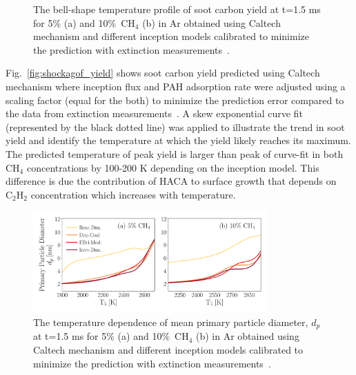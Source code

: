 \begin{figure}[H]
	\centering
	\caption{The bell-shape temperature profile of soot carbon yield at t=1.5 ms for 5\% (a) and 10\%~$\mathrm{CH_4}$ (b) in Ar obtained using Caltech mechanism and different inception models calibrated to minimize the prediction with extinction measurements~\citep{agafonov2016unified}.}
	\label{fig:shockagof_yield_cvr} 
\end{figure}

Fig.~\ref{fig:shockagof_yield} shows soot carbon yield predicted using Caltech mechanism where inception flux and PAH adsorption rate were adjusted using a scaling factor (equal for the both) to minimize the prediction error compared to the data from extinction measurements~\citep{agafonov2016unified}. A skew exponential curve fit (represented by the black dotted line) was applied to illustrate the trend in soot yield and identify the temperature at which the yield likely reaches its maximum. The predicted temperature of peak yield is larger than peak of curve-fit in both $\mathrm{CH_4}$ concentrations by 100-200 K depending on the inception model. This difference is due the contribution of  HACA to surface growth that depends on $\mathrm{C_2H_2}$ concentration which increases with temperature.

\begin{figure}[H]
	\centering
	\includegraphics[width=0.8\textwidth]{Figures/Results/Shocktube/Agafonov2016_cvr/d_p.pdf}
	\caption{The temperature dependence of mean primary particle diameter, $d_p$ at t=1.5 ms for 5\% (a) and 10\%~$\mathrm{CH_4}$ (b) in Ar obtained using Caltech mechanism and different inception models calibrated to minimize the prediction with extinction measurements~\citep{agafonov2016unified}.}
	\label{fig:shockagof_dp_cvr} 
\end{figure}

